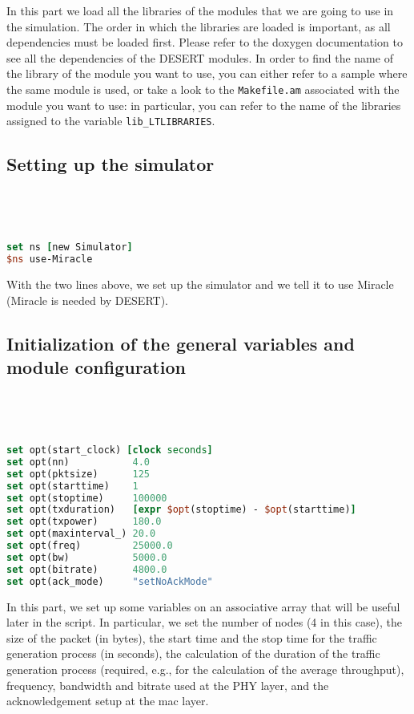 \documentclass[11pt]{article}
\begin{document}
In this part we load all the libraries of the modules that we are going to use in the simulation. The order in which the libraries are loaded is important, as all dependencies must be loaded first. Please refer to the doxygen documentation to see all the dependencies of the DESERT modules. In order to find the name of the library of the module you want to use, you can either refer to a sample where the same module is used, or take a look to the {\tt Makefile.am} associated with the module you want to use: in particular, you can refer to the name of the libraries assigned to the variable {\tt lib\_LTLIBRARIES}.


\subsection{Setting up the simulator}
\ 
{\scriptsize\tt
\begin{lstlisting}[language=tcl]
set ns [new Simulator]
$ns use-Miracle
\end{lstlisting}
}

With the two lines above, we set up the simulator and we tell it to use Miracle (Miracle is needed by DESERT).

\subsection{Initialization of the general variables and module configuration}
\ 
{\scriptsize\tt
\begin{lstlisting}[language=tcl]
set opt(start_clock) [clock seconds]
set opt(nn)           4.0
set opt(pktsize)      125
set opt(starttime)    1	
set opt(stoptime)     100000 
set opt(txduration)   [expr $opt(stoptime) - $opt(starttime)]
set opt(txpower)      180.0
set opt(maxinterval_) 20.0
set opt(freq)         25000.0
set opt(bw)           5000.0
set opt(bitrate)      4800.0
set opt(ack_mode)     "setNoAckMode"
\end{lstlisting}
}

In this part, we set up some variables on an associative array that will be useful later in the script. 
In particular, we set the number of nodes (4 in this case), the size 
of the packet (in bytes), the start time and the stop time for the traffic generation process (in seconds), the calculation of the duration of the traffic generation process (required, e.g., for the calculation of the average throughput), frequency, bandwidth and bitrate used at the PHY layer, and the acknowledgement setup at the mac layer.\\	
\end{document}
